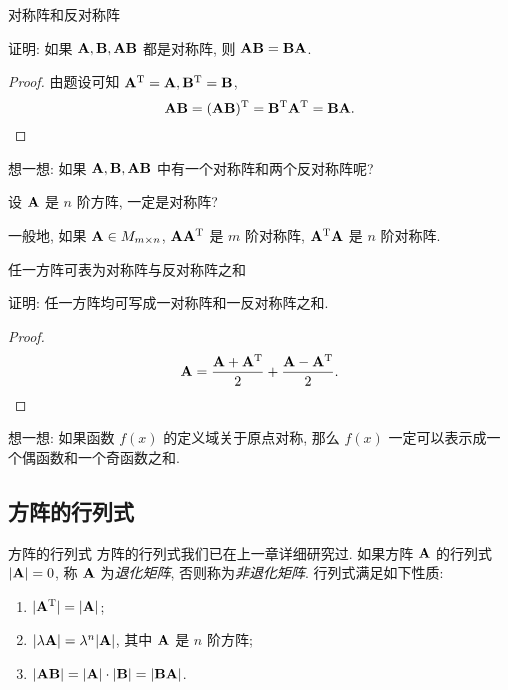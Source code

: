 \begin{frame}{对称阵和反对称阵}
	\onslide<+->
	\begin{example}
		证明: 如果 ${\mathbf{A}},{\mathbf{B}},{\mathbf{A}}{\mathbf{B}}$ 都是对称阵, 则 ${\mathbf{A}}{\mathbf{B}}={\mathbf{B}}{\mathbf{A}}$.
	\end{example}
	\onslide<+->
	\begin{proof}
		由题设可知 ${\mathbf{A}}^{\mathrm{T}}={\mathbf{A}},{\mathbf{B}}^{\mathrm{T}}={\mathbf{B}}$,
		\[{\mathbf{A}}{\mathbf{B}}=({\mathbf{A}}{\mathbf{B}})^{\mathrm{T}}={\mathbf{B}}^{\mathrm{T}}{\mathbf{A}}^{\mathrm{T}}={\mathbf{B}}{\mathbf{A}}.\qedhere\]
	\end{proof}
	\onslide<+->
	想一想: 如果 ${\mathbf{A}},{\mathbf{B}},{\mathbf{A}}{\mathbf{B}}$ 中有一个对称阵和两个反对称阵呢?
	\onslide<+->
	\begin{exercise}
		设 ${\mathbf{A}}$ 是 $n$ 阶方阵, 一定是对称阵?
	\end{exercise}
	\onslide<+->
	一般地, 如果 ${\mathbf{A}}\in M_{m\times n}$, ${\mathbf{A}}{\mathbf{A}}^{\mathrm{T}}$ 是 $m$ 阶对称阵, ${\mathbf{A}}^{\mathrm{T}}{\mathbf{A}}$ 是 $n$ 阶对称阵.
\end{frame}


\begin{frame}{任一方阵可表为对称阵与反对称阵之和}
	\onslide<+->
	\begin{example}
		证明: 任一方阵均可写成一对称阵和一反对称阵之和.
	\end{example}
	\onslide<+->
	\begin{proof}
		\[{\mathbf{A}}=\frac{{\mathbf{A}}+{\mathbf{A}}^{\mathrm{T}}}2+\frac{{\mathbf{A}}-{\mathbf{A}}^{\mathrm{T}}}2.\qedhere\]
	\end{proof}
	\onslide<+->
	想一想: 如果函数 $f(x)$ 的定义域关于原点对称, 那么 $f(x)$ 一定可以表示成一个偶函数和一个奇函数之和.
\end{frame}


\subsection{方阵的行列式}

\begin{frame}{方阵的行列式}
	\onslide<+->
	方阵的行列式我们已在上一章详细研究过.
	\onslide<+->
	如果方阵 ${\mathbf{A}}$ 的行列式 $|{\mathbf{A}}|=0$, 称 ${\mathbf{A}}$ 为\emph{退化矩阵}, 否则称为\emph{非退化矩阵}.
	\onslide<+->
	行列式满足如下性质:
	\begin{enumerate}
		\item $|{\mathbf{A}}^{\mathrm{T}}|=|{\mathbf{A}}|$;
		\item $|\lambda{\mathbf{A}}|=\lambda^n|{\mathbf{A}}|$, 其中 ${\mathbf{A}}$ 是 $n$ 阶方阵;
		\item \alert{$|{\mathbf{A}}{\mathbf{B}}|=|{\mathbf{A}}|\cdot|{\mathbf{B}}|=|{\mathbf{B}}{\mathbf{A}}|$}.
	\end{enumerate}
\end{frame}



